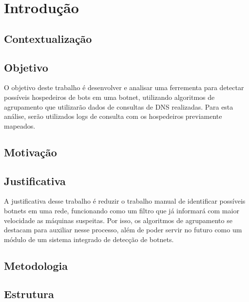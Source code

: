 \chapter{Introdução}
\section{Contextualização}
\section{Objetivo}
O objetivo deste trabalho é desenvolver e analisar uma ferrementa para detectar possíveis hospedeiros de bots em uma botnet, utilizando algoritmos de agrupamento que utilizarão dados de consultas de DNS realizadas. Para esta análise, serão utilizados logs de consulta com os hospedeiros previamente mapeados.

\section{Motivação}

\section{Justificativa}
A justificativa desse trabalho é reduzir o trabalho manual de identificar possíveis botnets em uma rede, funcionando como um filtro que já informará com maior velocidade as máquinas suspeitas. Por isso, os algoritmos de agrupamento se destacam para auxiliar nesse processo, além de poder servir no futuro como um módulo de um sistema integrado de detecção de botnets\cite{silva2012arquitetura}.
\section{Metodologia}
\section{Estrutura}